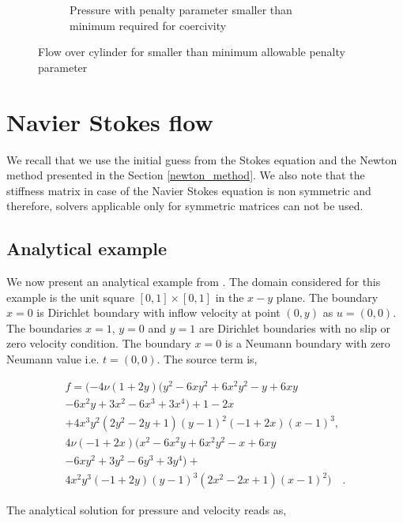 \documentclass[a4paper,openany]{book}
\begin{document}
\begin{figure}
\begin{subfigure}{\textwidth}
    \caption{Pressure with penalty parameter smaller than minimum required for coercivity}
      \label{pressure_stoke_c11_low}
\end{subfigure}
\caption{Flow over cylinder for smaller than minimum allowable penalty parameter}
\label{flow_over_cylinder_c11_low}
\end{figure}

\section{Navier Stokes flow}\label{N-S-ch5}

We recall that we use the initial guess from the Stokes equation and the Newton method presented in the Section  \ref{newton_method}. We also note that the stiffness matrix in case of the Navier Stokes equation is non symmetric and therefore, solvers applicable only for symmetric matrices can not be used. 

\subsection{Analytical example}

We now present an analytical example from \cite{Montlaur}. The domain considered for this example is the unit square $[0,1] \times [0,1]$ in the $x-y$ plane. 
The boundary ${x=0}$ is Dirichlet boundary with inflow velocity at point $(0,y)$ as $u = (0, 0)$. The boundaries ${x = 1}$, ${y = 0}$ and ${y = 1}$ are Dirichlet boundaries with no slip or zero velocity condition. The boundary ${x = 0}$ is a Neumann boundary with zero Neumann value i.e. $t = (0, 0)$. The source term is,

\begin{equation}
\begin{split}
f = (-4 \nu (1+2y) (y^2 - 6xy^2 + 6x^2 y^2 - y + 6xy \\ - 6x^2 y + 3x^2 - 6x^3 + 3x^4)+ 1 - 2x \\+ 4x^3 y^2 (2y^2 - 2y + 1)(y - 1)^2 (-1 + 2x)(x - 1)^3,\\ 4 \nu (-1 + 2x)(x^2 - 6x^2 y + 6x^2 y^2 - x + 6xy \\ - 6xy^2 + 3y^2 - 6y^3 + 3y^4) + \\ 4x^2y^3 (-1+2y)(y-1)^3 (2x^2-2x+1)(x-1)^2) \quad \textrm{.}
\end{split}
\end{equation}
 
The analytical solution for pressure and velocity reads as,
\end{document}
